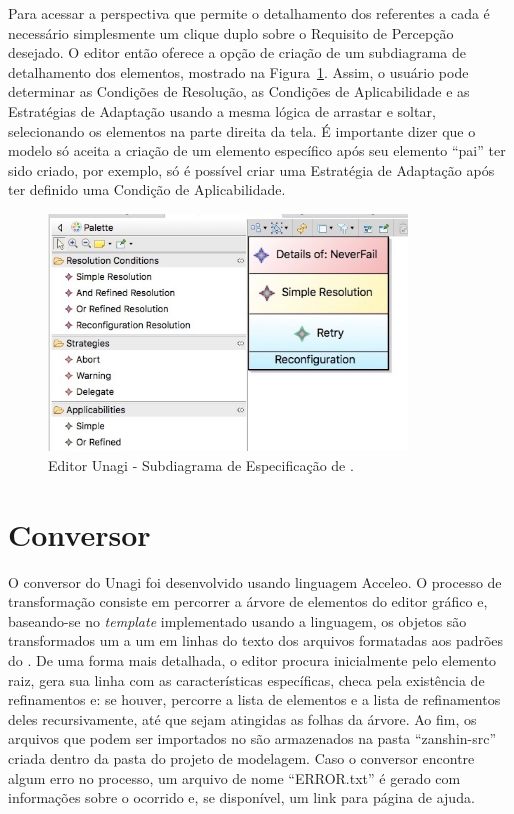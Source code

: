 Para acessar a perspectiva que permite o detalhamento dos \evoreqs referentes a cada \awreq é necessário simplesmente um clique duplo sobre o Requisito de Percepção desejado. O editor então oferece a opção de criação de um subdiagrama de detalhamento dos elementos, mostrado na Figura~\ref{figura-subdiagrama-awreq}. Assim, o usuário pode determinar as Condições de Resolução, as Condições de Aplicabilidade e as Estratégias de Adaptação usando a mesma lógica de arrastar e soltar, selecionando os elementos na parte direita da tela. É importante dizer que o modelo só aceita a criação de um elemento específico após seu elemento ``pai'' ter sido criado, por exemplo, só é possível criar uma Estratégia de Adaptação após ter definido uma Condição de Aplicabilidade.

\begin{figure}
	\centering
	\includegraphics[width=0.85\textwidth]{figuras/unagi/unagisubdiagrama.jpg}
	\caption{Editor Unagi - Subdiagrama de Especificação de \evoreqs.}
	\label{figura-subdiagrama-awreq}
\end{figure}

\section{Conversor}
\label{sec-unagi-conversor}

O conversor do Unagi foi desenvolvido usando linguagem Acceleo. O processo de transformação consiste em percorrer a árvore de elementos do editor gráfico e, baseando-se no \textit{template} implementado usando a linguagem, os objetos são transformados um a um em linhas do texto dos arquivos \xml formatadas aos padrões do \zanshin. De uma forma mais detalhada, o editor procura inicialmente pelo elemento raiz, gera sua linha com as características específicas, checa pela existência de refinamentos e: se houver, percorre a lista de elementos e a lista de refinamentos deles recursivamente, até que sejam atingidas as folhas da árvore. Ao fim, os arquivos que podem ser importados no \zanshin são armazenados na pasta ``zanshin-src'' criada dentro da pasta do projeto de modelagem. Caso o conversor encontre algum erro no processo, um arquivo de nome ``ERROR.txt'' é gerado com informações sobre o ocorrido e, se disponível, um link para página de ajuda.
